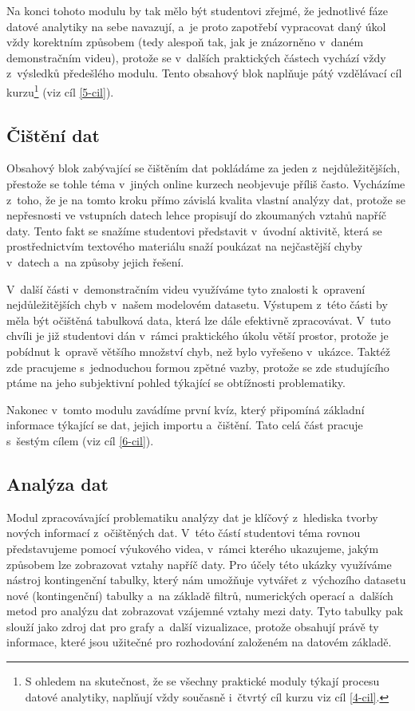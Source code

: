 Na konci tohoto modulu by tak mělo být studentovi zřejmé, že jednotlivé fáze datové analytiky na sebe navazují, a~je proto zapotřebí vypracovat daný úkol vždy korektním způsobem (tedy alespoň tak, jak je znázorněno v~daném demonstračním videu), protože se v~dalších praktických částech vychází vždy z~výsledků předešlého modulu. Tento obsahový blok naplňuje pátý vzdělávací cíl kurzu\footnote{S ohledem na skutečnost, že se všechny praktické moduly týkají procesu datové analytiky, naplňují vždy současně i~čtvrtý cíl kurzu viz cíl \ref{4-cil}.} (viz cíl \ref{5-cil}).

\hypertarget{ux10diux161tux11bnuxed-dat}{%
\subsection{Čištění dat}\label{ux10diux161tux11bnuxed-dat}}

Obsahový blok zabývající se čištěním dat pokládáme za jeden z~nejdůležitějších, přestože se tohle téma v~jiných online kurzech neobjevuje příliš často. Vycházíme z~toho, že je na tomto kroku přímo závislá kvalita vlastní analýzy dat, protože se nepřesnosti ve vstupních datech lehce propisují do zkoumaných vztahů napříč daty. Tento fakt se snažíme studentovi představit v~úvodní aktivitě, která se prostřednictvím textového materiálu snaží poukázat na nejčastější chyby v~datech a~na způsoby jejich řešení.

V~další části v~demonstračním videu využíváme tyto znalosti k~opravení nejdůležitějších chyb v~našem modelovém datasetu. Výstupem z~této části by měla být očištěná tabulková data, která lze dále efektivně zpracovávat. V~tuto chvíli je již studentovi dán v~rámci praktického úkolu větší prostor, protože je pobídnut k~opravě většího množství chyb, než bylo vyřešeno v~ukázce. Taktéž zde pracujeme s~jednoduchou formou zpětné vazby, protože se zde studujícího ptáme na jeho subjektivní pohled týkající se obtížnosti problematiky.

Nakonec v~tomto modulu zavádíme první kvíz, který připomíná základní informace týkající se dat, jejich importu a~čištění. Tato celá část pracuje s~šestým cílem (viz cíl \ref{6-cil}).

\hypertarget{analuxfdza-dat}{%
\subsection{Analýza dat}\label{analuxfdza-dat}}

Modul zpracovávající problematiku analýzy dat je klíčový z~hlediska tvorby nových informací z~očištěných dat. V~této částí studentovi téma rovnou představujeme pomocí výukového videa, v~rámci kterého ukazujeme, jakým způsobem lze zobrazovat vztahy napříč daty. Pro účely této ukázky využíváme nástroj kontingenční tabulky, který nám umožňuje vytvářet z~výchozího datasetu nové (kontingenční) tabulky a~na základě filtrů, numerických operací a~dalších metod pro analýzu dat zobrazovat vzájemné vztahy mezi daty. Tyto tabulky pak slouží jako zdroj dat pro grafy a~další vizualizace, protože obsahují právě ty informace, které jsou užitečné pro rozhodování založeném na datovém základě.

